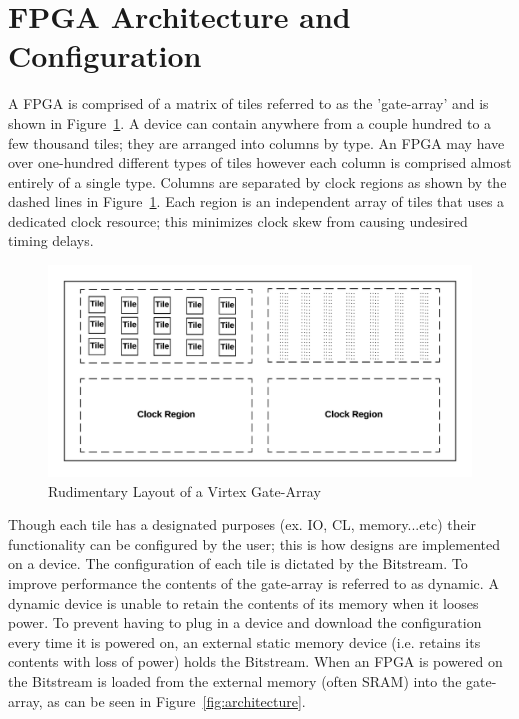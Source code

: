 \section{FPGA Architecture and Configuration}
A \Xilinx \acrfull{FPGA} is comprised of a matrix of tiles referred to as the 'gate-array' and is shown in Figure~\ref{fig:FPGA}.
A device can contain anywhere from a couple hundred to a few thousand tiles; they are arranged into columns by type.
An FPGA may have over one-hundred different types of tiles however each column is comprised almost entirely of a single type.
Columns are separated by clock regions as shown by the dashed lines in Figure~\ref{fig:FPGA}.
Each region is an independent array of tiles that uses a dedicated clock resource; this minimizes clock skew from causing undesired timing delays.
\begin{figure}[h]
	\centering
	\includegraphics[width=1\linewidth]{figures/FPGA}
	\caption[Rudimentary Layout of a Virtex Gate-Array]{Rudimentary Layout of a Virtex Gate-Array}
	\label{fig:FPGA}
\end{figure}
Though each tile has a designated purposes (ex. \acrfull{IO}, \acrfull{CL}, memory...etc) their functionality can be configured by the user; this is how designs are implemented on a device.
The configuration of each tile is dictated by the \gls{Bitstream}. 
To improve performance the contents of the gate-array is referred to as dynamic.
A dynamic device is unable to retain the contents of its memory when it looses power.
To prevent having to plug in a device and download the configuration every time it is powered on, an external static memory device (i.e. retains its contents with loss of power) holds the \gls{Bitstream}. 
When an \acrshort{FPGA} is powered on the \gls{Bitstream} is loaded from the external memory (often \acrfull{SRAM}) into the gate-array, as can be seen in Figure~\ref{fig:architecture}.


